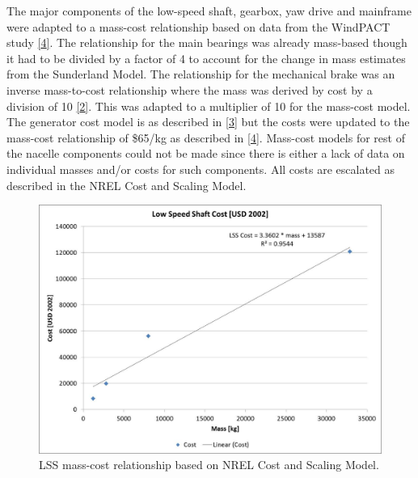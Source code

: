 \documentclass[letterpaper,10pt,openany,oneside]{sphinxmanual}
\begin{document}
The major components of the low-speed shaft, gearbox, yaw drive and mainframe were adapted to a mass-cost relationship based on data from the WindPACT study {\hyperref[theory:4]{{[}4{]}}}.  The relationship for the main bearings was already mass-based though it had to be divided by a factor of 4 to account for the change in mass estimates from the Sunderland Model.  The relationship for the mechanical brake was an inverse mass-to-cost relationship where the mass was derived by cost by a division of 10 {\hyperref[theory:2]{{[}2{]}}}.  This was adapted to a multiplier of 10 for the mass-cost model.  The generator cost model is as described in {\hyperref[theory:3]{{[}3{]}}} but the costs were updated to the mass-cost relationship of \$65/kg as described in {\hyperref[theory:4]{{[}4{]}}}.  Mass-cost models for rest of the nacelle components could not be made since there is either a lack of data on individual masses and/or costs for such components.  All costs are escalated as described in the NREL Cost and Scaling Model.
\begin{figure}[htbp]
\centering
\capstart

\includegraphics[width=6.5in]{lssCost.pdf}
\caption{LSS mass-cost relationship based on NREL Cost and Scaling Model.}\label{theory:lsscost}\end{figure}
\end{document}
